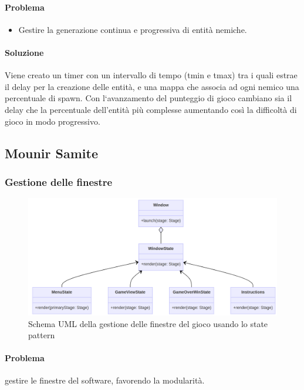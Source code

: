 \documentclass[a4paper,12pt]{report}
\begin{document}
\paragraph{Problema}
\begin{itemize}
    \item Gestire la generazione continua e progressiva di entità nemiche.
\end{itemize}

\paragraph{Soluzione}
Viene creato un timer con un intervallo di tempo (tmin e tmax) tra i quali estrae il delay per la creazione delle entità, e una mappa che associa ad ogni nemico una percentuale di spawn.
Con l`avanzamento del punteggio di gioco cambiano sia il delay che la percentuale dell'entità più complesse aumentando così la difficoltà di gioco in modo progressivo.

\subsection*{Mounir Samite}
\subsubsection*{Gestione delle finestre}
\begin{figure}[h]
\centering{}
\includegraphics[width=1\textwidth]{img/WindowManagement.png}
\caption{Schema UML della gestione delle finestre del gioco usando lo state pattern}
\end{figure}
\paragraph*{Problema} gestire le finestre del software, favorendo la modularità.
\end{document}
